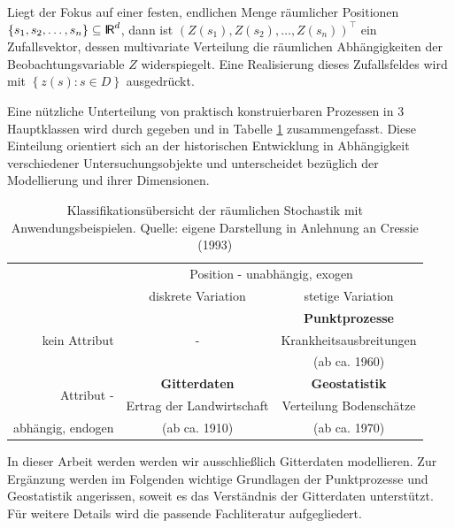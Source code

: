Liegt der Fokus auf einer festen, endlichen Menge räumlicher 
Positionen $ \left\{  s_1 , s_2 ,\ldots , s_n \right\} \subseteq {\sf I\kern-0.14emR}^d$, 
dann ist $ \left( Z(s_1),Z(s_2),\ldots,Z(s_n) \right)^{\top} $ ein Zufallsvektor, 
dessen multivariate Verteilung die räumlichen Abhängigkeiten der Beobachtungsvariable $Z$ widerspiegelt. 
Eine Realisierung dieses Zufallsfeldes wird mit $\left\{ z(s):s \in D \right\}$ ausgedrückt.

Eine nützliche Unterteilung von praktisch konstruierbaren Prozessen in 3 Hauptklassen 
wird durch \cite{cressie_statistics_1993} gegeben und in 
Tabelle \ref{table_main-classes} zusammengefasst. 
Diese Einteilung orientiert sich an der historischen 
Entwicklung in Abhängigkeit verschiedener Untersuchungsobjekte und unterscheidet bezüglich 
der Modellierung und ihrer Dimensionen.

\begin{table}[h!]
    \begin{center}
    \begin{tabular}{|r|c|c|}
    \hline
            & \multicolumn{2}{|c|}{\sc Position - unabhängig, exogen} \\
            \cline{2-3}
            & {\sc diskrete Variation}  & {\sc stetige Variation} \\
    \hline
    \multirow{3}{*}{\sc kein Attribut}  &    \multirow{3}{*}{-}    & \textbf{Punktprozesse} \\
            &                   & Krankheitsausbreitungen \\
            &                   & (ab ca. 1960) \\
    \hline
    \multirow{2}{*}{\sc Attribut -} & \textbf{Gitterdaten} & \textbf{Geostatistik} \\    
              & Ertrag der Landwirtschaft & Verteilung Bodenschätze \\
    {\sc abhängig, endogen}   & (ab ca. 1910) & (ab ca. 1970) \\
    \hline
    \end{tabular}
    \end{center}
    \caption{Klassifikationsübersicht der räumlichen Stochastik mit Anwendungsbeispielen. Quelle: eigene Darstellung in Anlehnung an Cressie (1993)}
    \label{table_main-classes}
\end{table}
In dieser Arbeit werden werden wir ausschließlich Gitterdaten modellieren. 
Zur Ergänzung werden im Folgenden wichtige Grundlagen der Punktprozesse und Geostatistik angerissen, 
soweit es das Verständnis der Gitterdaten unterstützt. Für weitere Details wird die passende Fachliteratur aufgegliedert.


